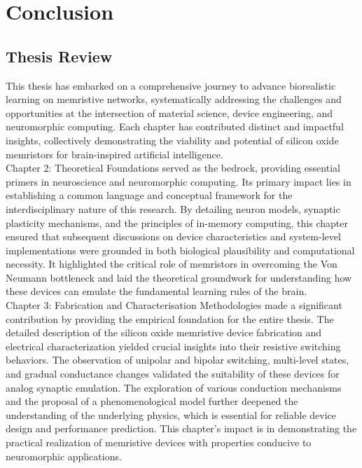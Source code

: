 
\chapter{Conclusion}

\section[Thesis Review]{Thesis Review}

This thesis has embarked on a comprehensive journey to advance biorealistic learning on memristive networks, systematically addressing the challenges and opportunities at the intersection of material science, device engineering, and neuromorphic computing. Each chapter has contributed distinct and impactful insights, collectively demonstrating the viability and potential of silicon oxide memristors for brain-inspired artificial intelligence.\\

\noindent Chapter 2: Theoretical Foundations served as the bedrock, providing essential primers in neuroscience and neuromorphic computing. Its primary impact lies in establishing a common language and conceptual framework for the interdisciplinary nature of this research. By detailing neuron models, synaptic plasticity mechanisms, and the principles of in-memory computing, this chapter ensured that subsequent discussions on device characteristics and system-level implementations were grounded in both biological plausibility and computational necessity. It highlighted the critical role of memristors in overcoming the Von Neumann bottleneck and laid the theoretical groundwork for understanding how these devices can emulate the fundamental learning rules of the brain.\\

\noindent Chapter 3: Fabrication and Characterisation Methodologies made a significant contribution by providing the empirical foundation for the entire thesis. The detailed description of the silicon oxide memristive device fabrication and electrical characterization yielded crucial insights into their resistive switching behaviors. The observation of unipolar and bipolar switching, multi-level states, and gradual conductance changes validated the suitability of these devices for analog synaptic emulation. The exploration of various conduction mechanisms and the proposal of a phenomenological model further deepened the understanding of the underlying physics, which is essential for reliable device design and performance prediction. This chapter's impact is in demonstrating the practical realization of memristive devices with properties conducive to neuromorphic applications.\\

